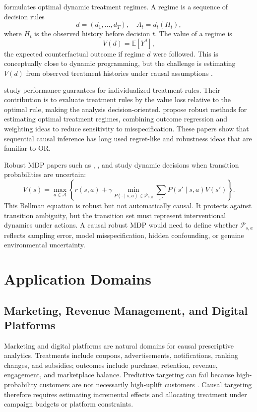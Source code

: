 \documentclass[11pt]{article}
\begin{document}
\citet{murphy2003dynamic} formulates optimal dynamic treatment regimes. A regime is a sequence of decision rules
\[
    d=(d_1,\ldots,d_T),\quad A_t=d_t(H_t),
\]
where $H_t$ is the observed history before decision $t$. The value of a regime is
\[
    V(d)=\mathbb{E}[Y^d],
\]
the expected counterfactual outcome if regime $d$ were followed. This is conceptually close to dynamic programming, but the challenge is estimating $V(d)$ from observed treatment histories under causal assumptions \citep{murphy2003dynamic,hernan2020causal}.

\citet{qian2011performance} study performance guarantees for individualized treatment rules. Their contribution is to evaluate treatment rules by the value loss relative to the optimal rule, making the analysis decision-oriented. \citet{zhang2012robust} propose robust methods for estimating optimal treatment regimes, combining outcome regression and weighting ideas to reduce sensitivity to misspecification. These papers show that sequential causal inference has long used regret-like and robustness ideas that are familiar to OR.

Robust MDP papers such as \citet{iyengar2005robust}, \citet{nilim2005robust}, and \citet{wiesemann2013robust} study dynamic decisions when transition probabilities are uncertain:
\[
    V(s)=\max_{a\in\mathcal{A}}
    \left\{
    r(s,a)+\gamma\min_{P(\cdot\mid s,a)\in\mathcal{P}_{s,a}}
    \sum_{s'}P(s'\mid s,a)V(s')
    \right\}.
\]
This Bellman equation is robust but not automatically causal. It protects against transition ambiguity, but the transition set must represent interventional dynamics under actions. A causal robust MDP would need to define whether $\mathcal{P}_{s,a}$ reflects sampling error, model misspecification, hidden confounding, or genuine environmental uncertainty.

\section{Application Domains}
\label{sec:applications}

\subsection{Marketing, Revenue Management, and Digital Platforms}

Marketing and digital platforms are natural domains for causal prescriptive analytics. Treatments include coupons, advertisements, notifications, ranking changes, and subsidies; outcomes include purchase, retention, revenue, engagement, and marketplace balance. Predictive targeting can fail because high-probability customers are not necessarily high-uplift customers \citep{fernandez2022causal,leporeni2023causally}. Causal targeting therefore requires estimating incremental effects and allocating treatment under campaign budgets or platform constraints.
\end{document}
